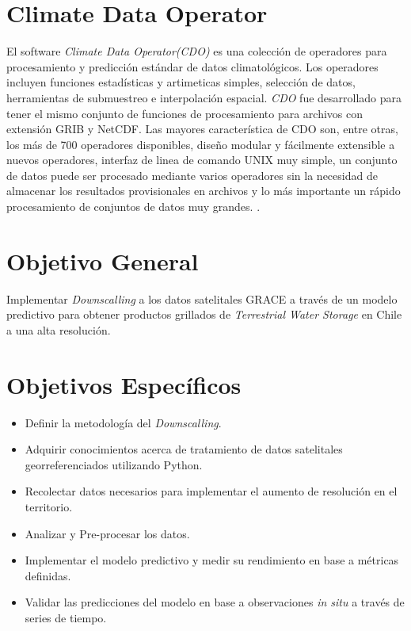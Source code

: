 \section{Climate Data Operator}
El software \textit{Climate Data Operator(CDO)} es una colección de operadores para procesamiento y predicción estándar de datos climatológicos.
Los operadores incluyen funciones estadísticas y artimeticas simples, selección de datos, herramientas de submuestreo e interpolación espacial.
\textit{CDO} fue desarrollado para tener el mismo conjunto de funciones de procesamiento para archivos con extensión GRIB y NetCDF. Las mayores característica
de CDO son, entre otras, los más de 700 operadores disponibles, diseño modular y fácilmente extensible a nuevos operadores, interfaz de linea de comando UNIX muy simple,
un conjunto de datos puede ser procesado mediante varios operadores sin la necesidad de almacenar los resultados provisionales en archivos y lo más importante un rápido procesamiento
de conjuntos de datos muy grandes. \cite{16}.
%
%
%
%
\section{Objetivo General}

Implementar \textit{Downscalling} a los datos satelitales GRACE a través de un modelo predictivo para obtener 
productos grillados de \textit{Terrestrial Water Storage} en Chile a una alta resolución.
%
%
%
%
\section{Objetivos Específicos}
\begin{itemize}
    \item Definir la metodología del \textit{Downscalling}.
    \item Adquirir conocimientos acerca de tratamiento de datos satelitales georreferenciados utilizando Python.
    \item Recolectar datos necesarios para implementar el aumento de resolución en el territorio.
    \item Analizar y Pre-procesar los datos. 
    \item Implementar el modelo predictivo y medir su rendimiento en base a métricas definidas.
    \item Validar las predicciones del modelo en base a observaciones \textit{in situ} a través de series de tiempo.
\end{itemize}